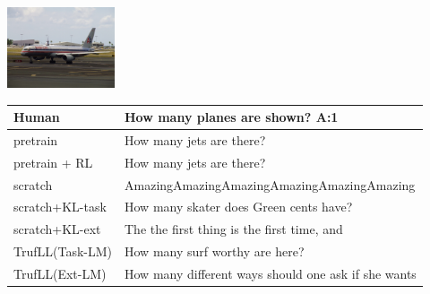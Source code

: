 \documentclass{article}
\newcommand{\algo}{TrufLL\xspace}
\begin{document}
\begin{table}[t!]
   \begin{minipage}{0.2\linewidth}
        \includegraphics[width=120px]{./COCO_val2014_000000216115.jpeg}
	\end{minipage}
	\hspace{1.2cm}
	\begin{minipage}{0.80\linewidth}
		\scriptsize
		\begin{tabular}{ll}
			Human           & How many planes are shown?  \quad \textbf{A:1} \\
			\midrule
			pretrain        & How many jets are there? \\
		    pretrain + RL   & How many jets are there? \\ \midrule
			scratch         & AmazingAmazingAmazingAmazingAmazingAmazing  \\
			scratch+KL-task & How many skater does Green cents have? \\
			scratch+KL-ext  & The the first thing is the first time, and\\ \midrule
			\algo(Task-LM) & How many surf worthy are here? \\
			\algo(Ext-LM)   & How many different ways should one ask if she wants \\
			\bottomrule
		\end{tabular}
	\end{minipage}
	\vspace{1mm}


\end{table}
\end{document}
